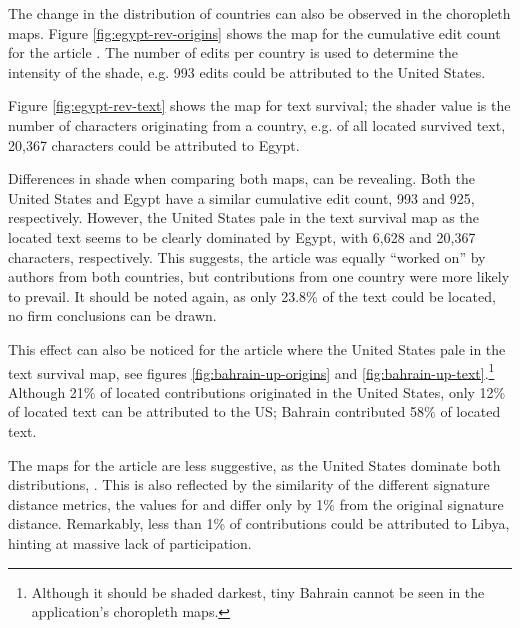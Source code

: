 The change in the distribution of countries can also be observed in the choropleth maps. 
Figure \ref{fig:egypt-rev-origins} shows the map for the cumulative edit count for the article .
The number of edits per country is used to determine the intensity of the shade, e.g. 993 edits could be attributed to the United States. 

Figure \ref{fig:egypt-rev-text} shows the map for text survival; the shader value is the number of characters originating from a country, e.g. of all located survived text, 20,367 characters could be attributed to Egypt.

Differences in shade when comparing both maps, can be revealing.
Both the United States and Egypt have a similar cumulative edit count, 993 and 925, respectively.
However, the United States pale in the text survival map as the located text seems to be clearly dominated by Egypt, with 6,628 and 20,367 characters, respectively.
This suggests, the article was equally ``worked on'' by authors from both countries, but contributions from one country were more likely to prevail.
It should be noted again, as only 23.8\% of the text could be located, no firm conclusions can be drawn.



This effect can also be noticed for the article  where the United States pale in the text survival map, see figures \ref{fig:bahrain-up-origins} and \ref{fig:bahrain-up-text}.\footnote{Although it should be shaded darkest, tiny Bahrain cannot be seen in the application's choropleth maps.}
Although 21\% of located contributions originated in the United States, only 12\% of located text can be attributed to the US; Bahrain contributed 58\% of located text.

The maps for the article  are less suggestive, as the United States dominate both distributions, .
This is also reflected by the similarity of the different signature distance metrics, the values for  and  differ only by 1\% from the original signature distance.
Remarkably, less than 1\% of contributions could be attributed to Libya, hinting at massive lack of participation.

